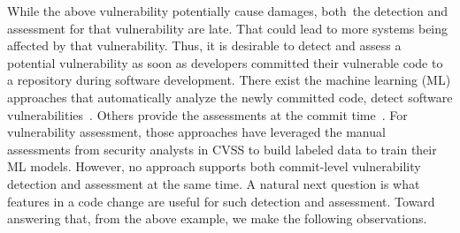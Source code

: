 While the above vulnerability potentially cause damages, both~the
detection and assessment for that vulnerability are late. That could
lead to more systems being affected by that vulnerability. Thus, it is
desirable to detect and assess a potential vulnerability as soon as
developers committed their vulnerable code to a repository during
software development. There exist the machine learning (ML) approaches
that automatically analyze the newly committed code, detect software
vulnerabilities~\cite{perl2015vccfinder,zhou2017automated,chen2019large}.
Others provide the assessments at the commit time~\cite{deepCVA-ase21}. For
vulnerability assessment, those approaches have leveraged the manual
assessments from security analysts in CVSS to build labeled data to
train their ML models. However, no approach supports both commit-level
vulnerability detection and assessment at the same time.
A natural next question is what features in a code change are useful
for such detection and assessment. Toward answering that, from the
above example, we make the following observations.


